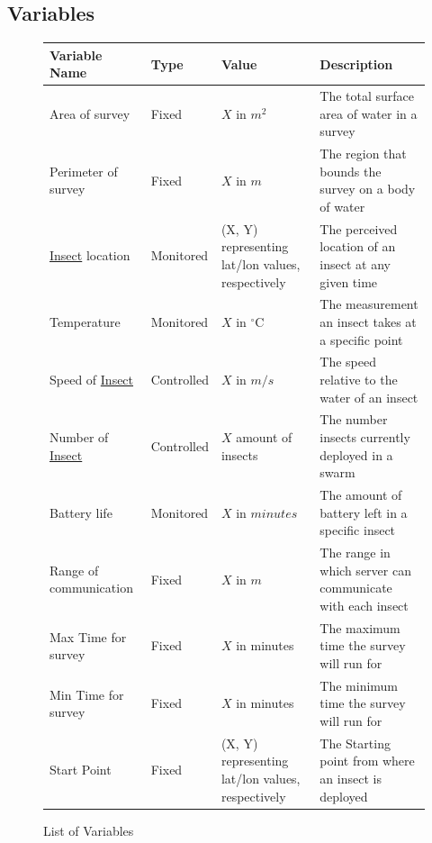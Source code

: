 \documentclass[11pt]{article}
\begin{document}
\subsection{Variables}
\begin{figure}[H]
   \centering
   \noindent\begin{tabularx}{\textwidth}{| >{\centering\arraybackslash}m{} | >{\centering\arraybackslash}m{} | >{\centering\arraybackslash}m{} | >{\centering\arraybackslash}m{} |}
   \hline 
   \textbf{Variable Name} & \textbf{Type} & \textbf{Value} & \textbf{Description} \\
   \hline
   Area of survey & Fixed & $X$ in $m^2$ & The total surface area of water in a survey \\ \hline
   Perimeter of survey & Fixed & $X$ in $m$ & The region that bounds the survey on a body of water \\ \hline
   \hyperref[sec:definitions]{Insect} location & Monitored & (X, Y) representing lat/lon values, respectively & The perceived location of an insect at any given time\\ \hline
   Temperature & Monitored & $X$ in $^\circ$C & The measurement an insect takes at a specific point\\ \hline
   Speed of  \hyperref[sec:definitions]{Insect} & Controlled & $X$ in $m/s$  & The speed relative to the water of an insect \\ \hline
   Number of \hyperref[sec:definitions]{Insect} & Controlled & $X$ amount of insects & The number insects currently deployed in a swarm\\ \hline
   Battery life & Monitored & $X$ in $minutes$ & The amount of battery left in a specific insect \\ \hline
   Range of communication & Fixed & $X$ in $m$ & The range in which server can communicate with each insect \\ \hline
   Max Time for survey & Fixed & $X$ in minutes & The maximum time the survey will run for\\ \hline
   Min Time for survey & Fixed & $X$ in minutes & The minimum time the survey will run for \\ \hline
   Start Point & Fixed & (X, Y) representing lat/lon values, respectively & The Starting point from where an insect is deployed \\ \hline
   \end{tabularx}
   \caption{List of Variables}
\end{figure}
\end{document}
